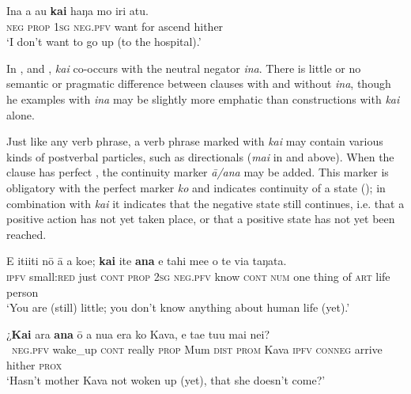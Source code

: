 \ea\label{ex:10.122}
\gll {\ꞌ}Ina a au \textbf{kai} haŋa mo iri atu. \\
\textsc{neg} \textsc{prop} \textsc{1sg} \textsc{neg.pfv} want for ascend hither \\

\glt 
‘I don’t want to go up (to the hospital).’ \textstyleExampleref{[R162.023]} 
\z

In ,  and , \textit{kai} co-occurs with the neutral negator \textit{{\ꞌ}ina}. There is little or no semantic or pragmatic difference between clauses with and without \textit{{\ꞌ}ina}, though he examples with \textit{{\ꞌ}ina} may be slightly more emphatic than constructions with \textit{kai} alone.

Just like any verb phrase, a verb phrase marked with \textit{kai} may contain various kinds of postverbal particles, such as directionals (\textit{mai} in  and  above). When the clause has perfect , the continuity marker \textit{{\ꞌ}ā/{\ꞌ}ana} may be added. This marker is obligatory with the perfect marker \textit{ko} and indicates continuity of a state (); in combination with \textit{kai} it indicates that the negative state still continues, i.e. that a positive action has not yet taken place, or that a positive state has not yet been reached.

\ea\label{ex:10.123}
\gll E {\ꞌ}iti{\ꞌ}iti nō {\ꞌ}ā a koe; \textbf{kai} {\ꞌ}ite \textbf{{\ꞌ}ana} e tahi me{\ꞌ}e  o te via taŋata.\\
\textsc{ipfv} small:\textsc{red} just \textsc{cont} \textsc{prop} \textsc{2sg} \textsc{neg.pfv} know \textsc{cont} \textsc{num} one thing  of \textsc{art} life person\\

\glt 
‘You are (still) little; you don’t know anything about human life (yet).’ \textstyleExampleref{[R210.052]} 
\z

\ea\label{ex:10.124}
\gll ¿\textbf{Kai} {\ꞌ}ara \textbf{{\ꞌ}ana} {\ꞌ}ō a nua era ko Kava, e ta{\ꞌ}e tu{\ꞌ}u mai nei?\\
~\textsc{neg.pfv} wake\_up \textsc{cont} really \textsc{prop} Mum \textsc{dist} \textsc{prom} Kava \textsc{ipfv} \textsc{conneg} arrive hither \textsc{prox}\\

\glt 
‘Hasn’t mother Kava not woken up (yet), that she doesn’t come?’ \textstyleExampleref{[R229.359]}\textstyleExampleref{} 
\z
{}
